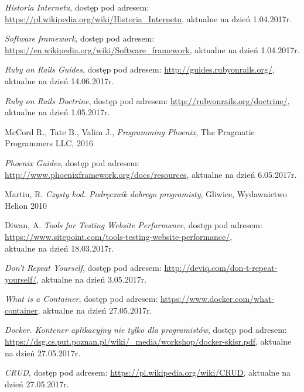 \documentclass[mgr,oneside]{mgr}
\begin{document}
\renewcommand\bibname{Literatura}
\begin{thebibliography}{inteligencja}

  \emph{Historia Internetu}, dostęp pod adresem: \url{https://pl.wikipedia.org/wiki/Historia_Internetu}, aktualne na dzień 1.04.2017r.

  \emph{Software framework}, dostęp pod adresem: \url{https://en.wikipedia.org/wiki/Software_framework}, aktualne na dzień 1.04.2017r.

	\emph{Ruby on Rails Guides}, dostęp pod adresem: \url{http://guides.rubyonrails.org/},\\ aktualne na dzień 14.06.2017r.

  \emph{Ruby on Rails Doctrine}, dostęp pod adresem: \url{http://rubyonrails.org/doctrine/}, aktualne na dzień 1.05.2017r.

  McCord R., Tate B., Valim J., \emph{Programming Phoenix}, The Pragmatic Programmers LLC, 2016

  \emph{Phoenix Guides}, dostęp pod adresem: \url{http://www.phoenixframework.org/docs/resources}, aktualne na dzień 6.05.2017r.

	Martin, R. \emph{Czysty kod. Podręcznik dobrego programisty}, Gliwice, Wydawnictwo Helion 2010

  Diwan, A. \emph{Tools for Testing Website Performance}, dostęp pod adresem: \url{https://www.sitepoint.com/tools-testing-website-performance/}, \\ aktualne na dzień 18.03.2017r.

  \emph{Don't Repeat Yourself}, dostęp pod adresem: \url{http://deviq.com/don-t-repeat-yourself/}, aktualne na dzień 3.05.2017r.

  \emph{What is a Container}, dostęp pod adresem: \url{https://www.docker.com/what-container}, aktualne na dzień 27.05.2017r.

  \emph{Docker. Kontener aplikacyjny nie tylko dla programistów}, dostęp pod adresem: \url{https://dsg.cs.put.poznan.pl/wiki/_media/workshop/docker-skisr.pdf}, aktualne na dzień 27.05.2017r.

  \emph{CRUD}, dostęp pod adresem: \url{https://pl.wikipedia.org/wiki/CRUD}, aktualne na dzień 27.05.2017r.


\end{thebibliography}
\end{document}
